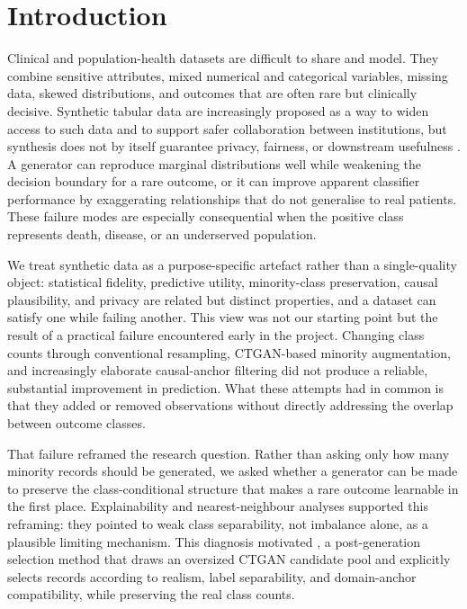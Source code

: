 \section{Introduction}
\label{sec:introduction}

Clinical and population-health datasets are difficult to share and model. They combine sensitive attributes, mixed numerical and categorical variables, missing data, skewed distributions, and outcomes that are often rare but clinically decisive. Synthetic tabular data are increasingly proposed as a way to widen access to such data and to support safer collaboration between institutions, but synthesis does not by itself guarantee privacy, fairness, or downstream usefulness \citep{goncalves2020,hernandez2023,nanevski2026}. A generator can reproduce marginal distributions well while weakening the decision boundary for a rare outcome, or it can improve apparent classifier performance by exaggerating relationships that do not generalise to real patients. These failure modes are especially consequential when the positive class represents death, disease, or an underserved population.

We treat synthetic data as a purpose-specific artefact rather than a single-quality object: statistical fidelity, predictive utility, minority-class preservation, causal plausibility, and privacy are related but distinct properties, and a dataset can satisfy one while failing another. This view was not our starting point but the result of a practical failure encountered early in the project. Changing class counts through conventional resampling, CTGAN-based minority augmentation, and increasingly elaborate causal-anchor filtering did not produce a reliable, substantial improvement in prediction. What these attempts had in common is that they added or removed observations without directly addressing the overlap between outcome classes.

That failure reframed the research question. Rather than asking only how many minority records should be generated, we asked whether a generator can be made to preserve the class-conditional structure that makes a rare outcome learnable in the first place. Explainability and nearest-neighbour analyses supported this reframing: they pointed to weak class separability, not imbalance alone, as a plausible limiting mechanism. This diagnosis motivated \sepa{}, a post-generation selection method that draws an oversized CTGAN candidate pool and explicitly selects records according to realism, label separability, and domain-anchor compatibility, while preserving the real class counts.

